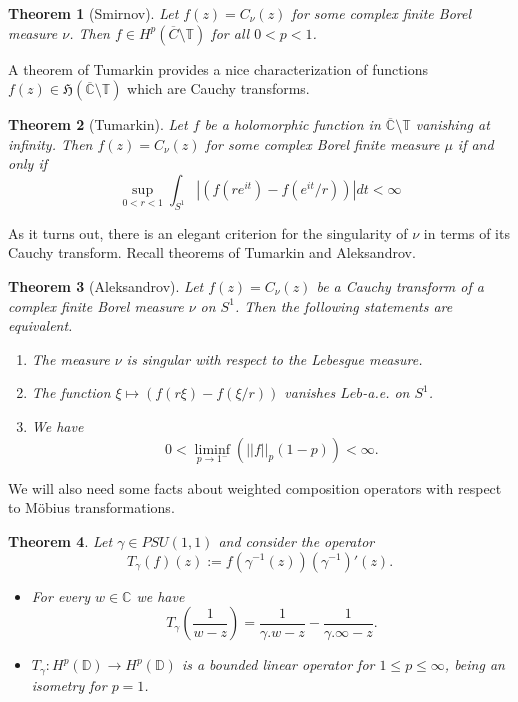 \documentclass[11pt]{article}
\newtheorem{theorem}{Theorem}[section]
\begin{document}
\begin{theorem}[Smirnov]
	\label{T:Smirnov}
	Let $f(z) = C_\nu(z)$ for some complex finite Borel measure $\nu$. Then $f \in H^p(\overline{C} \setminus \mathbb{T})$ for all $0 < p < 1$.
\end{theorem}

A theorem of Tumarkin provides a nice characterization of functions $f(z) \in \mathfrak{H}(\overline{\mathbb{C}} \setminus \mathbb{T})$ which are Cauchy transforms.

\begin{theorem}[Tumarkin]
	\label{T:Tumarkin}
	Let $f$ be a holomorphic function in $\overline{\mathbb{C}} \setminus \mathbb{T}$ vanishing at infinity. Then $f(z) = C_\nu(z)$ for some complex Borel finite measure $\mu$ if and only if
	\[
	\sup\limits_{0 < r < 1} \int_{S^1} |(f(r e^{it}) - f(e^{it} / r))| dt < \infty
	\]
\end{theorem}

As it turns out, there is an elegant criterion for the singularity of $\nu$ in terms of its Cauchy transform. Recall theorems of Tumarkin and Aleksandrov.

\begin{theorem}[Aleksandrov]
	\label{T:Aleksandrov}
	Let $f(z) = C_\nu(z)$ be a Cauchy transform of a complex finite Borel measure $\nu$ on $S^1$. Then the following statements are equivalent.
	\begin{enumerate}
		\item The measure $\nu$ is singular with respect to the Lebesgue measure.
		\item The function $\xi \mapsto (f(r \xi) - f(\xi / r))$ vanishes $Leb$-a.e. on $S^1$.
		\item We have
		\[
		0 < \liminf_{p \rightarrow 1^-} (||f||_p (1 - p) )< \infty.
		\]
	\end{enumerate}
\end{theorem}

We will also need some facts about weighted composition operators with respect to M\"obius transformations.

\begin{theorem}
	\label{weighted composition ops}
	Let $\gamma \in PSU(1,1)$ and consider the operator
	\[
	T_\gamma(f)(z) := f(\gamma^{-1}(z)) (\gamma^{-1})'(z).
	\] 
	\begin{itemize}
		\item For every $w \in \mathbb{C}$ we have
		\[
		T_\gamma \left( \frac{1}{w - z} \right) = \frac{1}{\gamma.w - z} - \frac{1}{\gamma.\infty - z}.
		\]
		\item $T_\gamma : H^p(\mathbb{D}) \rightarrow H^p(\mathbb{D})$ is a bounded linear operator for $1 \le p \le \infty$, being an isometry for $p = 1$.
	\end{itemize}
\end{theorem}
\end{document}
